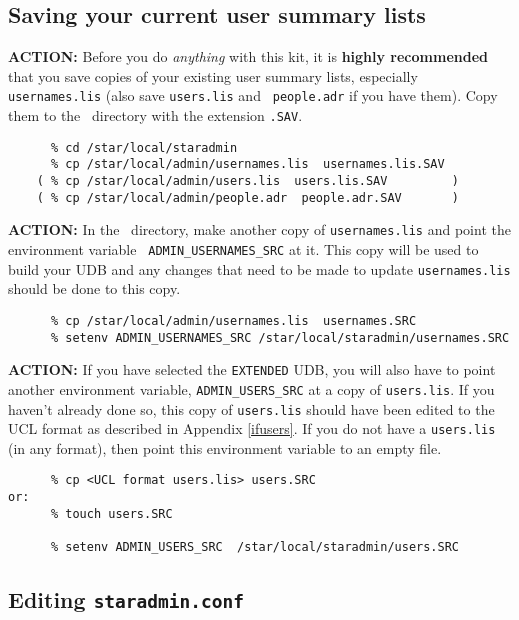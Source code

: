 \subsection{Saving your current user summary lists}

{\large\bf ACTION:} Before you do {\it anything} with this kit, it is {\bf
highly recommended} that you save copies of your existing user summary
lists, especially {\tt usernames.lis} (also save {\tt users.lis} and {\tt
people.adr} if you have them). Copy them to the \staradmin\ directory with
the extension {\tt .SAV}.

\begin{verbatim}
      % cd /star/local/staradmin
      % cp /star/local/admin/usernames.lis  usernames.lis.SAV
    ( % cp /star/local/admin/users.lis  users.lis.SAV         )
    ( % cp /star/local/admin/people.adr  people.adr.SAV       )
\end{verbatim}

{\large\bf ACTION:} In the \staradmin\ directory, make another copy of
{\tt usernames.lis} and point the environment variable {\tt
ADMIN\_USERNAMES\_SRC} at it. This copy will be used to build your UDB and
any changes that need to be made to update {\tt usernames.lis} should be
done to this copy.

\begin{verbatim}
      % cp /star/local/admin/usernames.lis  usernames.SRC
      % setenv ADMIN_USERNAMES_SRC /star/local/staradmin/usernames.SRC
\end{verbatim}

{\large\bf ACTION:} If you have selected the {\tt EXTENDED} UDB, you will
also have to point another environment variable, {\tt ADMIN\_USERS\_SRC}
at a copy of {\tt users.lis}. If you haven't already done so, this copy of
{\tt users.lis} should have been edited to the UCL format as described in
Appendix \ref{ifusers}. If you do not have a {\tt users.lis} (in any
format), then point this environment variable to an empty file.

\begin{verbatim}
      % cp <UCL format users.lis> users.SRC
or:
      % touch users.SRC

      % setenv ADMIN_USERS_SRC  /star/local/staradmin/users.SRC
\end{verbatim}


\subsection{Editing {\tt staradmin.conf}}

